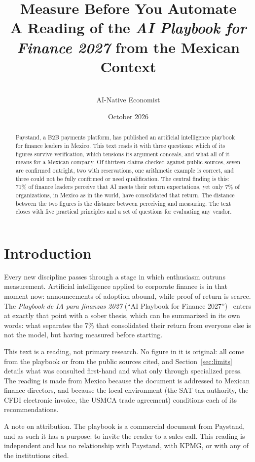 \documentclass[11pt,a4paper]{article}
\title{\textbf{Measure Before You Automate}\\[0.3em]
\large A Reading of the \emph{AI Playbook for Finance 2027} from the Mexican Context}
\author{\paperauthor\\[0.35em]
  {\normalsize\color{muted}AI-Native Economist}}
\date{October 2026}
\begin{document}
\maketitle

\begin{abstract}
\noindent
Paystand, a B2B payments platform, has published an artificial intelligence playbook for finance leaders in Mexico. This text reads it with three questions: which of its figures survive verification, which tensions its argument conceals, and what all of it means for a Mexican company. Of thirteen claims checked against public sources, seven are confirmed outright, two with reservations, one arithmetic example is correct, and three could not be fully confirmed or need qualification. The central finding is this: 71\% of finance leaders perceive that AI meets their return expectations, yet only 7\% of organizations, in Mexico as in the world, have consolidated that return. The distance between the two figures is the distance between perceiving and measuring. The text closes with five practical principles and a set of questions for evaluating any vendor.
\end{abstract}

\section{Introduction}

Every new discipline passes through a stage in which enthusiasm outruns measurement. Artificial intelligence applied to corporate finance is in that moment now: announcements of adoption abound, while proof of return is scarce. The \emph{Playbook de IA para finanzas 2027} (``AI Playbook for Finance 2027'')~\cite{paystand} enters at exactly that point with a sober thesis, which can be summarized in its own words: what separates the 7\% that consolidated their return from everyone else is not the model, but having measured before starting.

This text is a reading, not primary research. No figure in it is original: all come from the playbook or from the public sources cited, and Section~\ref{sec:limits} details what was consulted first-hand and what only through specialized press. The reading is made from Mexico because the document is addressed to Mexican finance directors, and because the local environment (the SAT tax authority, the CFDI electronic invoice, the USMCA trade agreement) conditions each of its recommendations.

A note on attribution. The playbook is a commercial document from Paystand, and as such it has a purpose: to invite the reader to a sales call. This reading is independent and has no relationship with Paystand, with KPMG, or with any of the institutions cited.
\end{document}
